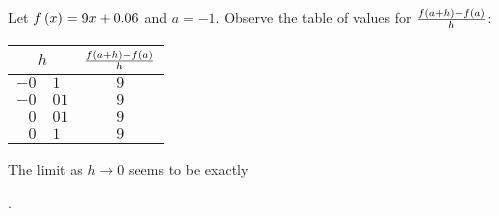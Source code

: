 \documentclass{ximera}
\author{Gregory Hartman \and Matthew Carr}
\begin{document}
\begin{exercise}







Let $f\left(x\right) = 9x+0.06$ and $a=-1$. Observe the table of values for $\frac{f\left(a+h\right)-f\left(a\right)}{h}$:
\begin{center}
 \begin{tabular}{r@{.}lc}
  \multicolumn{2}{c}{$h$} & $\frac{f\left(a+h\right)-f\left(a\right)}{h}$\\ \hline 
  $-0$ & $1$ & $9$ \\
  $-0$ & $01$ & $9$ \\
  $0$ & $01$ & $9$ \\
  $0$ & $1$ & $9$
 \end{tabular}
\end{center}
The limit as $h\to 0$ seems to be exactly \begin{prompt}\end{prompt}.

\end{exercise}
\end{document}
